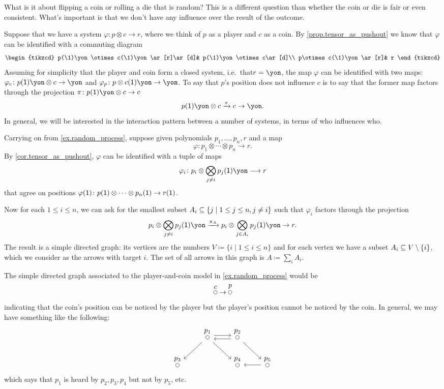 \documentclass[Book-Poly]{subfiles}
\begin{document}
\begin{example}\label{ex.random_process}
What is it about flipping a coin or rolling a die that is random? This is a different question than whether the coin or die is fair or even consistent. What's important is that we don't have any influence over the result of the outcome.

Suppose that we have a system $\varphi\colon p\otimes c\to r$, where we think of $p$ as a player and $c$ as a coin. By \cref{prop.tensor_as_pushout} we know that $\varphi$ can be identified with a commuting diagram
\[
\begin{tikzcd}
	p(\1)\yon\otimes c(\1)\yon\ar[r]\ar[d]&
	p(\1)\yon\otimes c\ar[d]\\
	p\otimes c(\1)\yon\ar[r]&
	r
\end{tikzcd}
\]
Assuming for simplicity that the player and coin form a closed system, i.e.\ that$r=\yon$, the map $\varphi$ can be identified with two maps: $\varphi_c\colon p(\1)\yon\otimes c\to\yon$ and $\varphi_p\colon p\otimes c(\1)\yon\to\yon$. To say that $p$'s position does not influence $c$ is to say that the former map factors through the projection $\pi\colon p(\1)\yon\otimes c\to c$
\[
	p(\1)\yon\otimes c\To{\pi} c\to \yon.
\]
In general, we will be interested in the interaction pattern between a number of systems, in terms of who influences who.
\end{example}

\begin{example}
Carrying on from \cref{ex.random_process}, suppose given polynomials $p_1,\ldots,p_n,r$ and a map
\[\varphi\colon p_1\otimes\cdots\otimes p_n\to r.\]
By \cref{cor.tensor_as_pushout}, $\varphi$ can be identified with a tuple of maps 
\[\varphi_i\colon p_i\otimes\bigotimes_{j\neq i}p_j(\1)\yon\too r\]
that agree on positions $\varphi(\1)\colon p(\1)\otimes\cdots\otimes p_n(\1)\to r(\1)$.

Now for each $1\leq i\leq n$, we can ask for the smallest subset $A_i\ss\{j\mid 1\leq j\leq n, j\neq i\}$ such that $\varphi_i$ factors through the projection
\[
	p_i\otimes\bigotimes_{j\neq i}p_j(\1)\yon\To{\pi_A}
	p_i\otimes\bigotimes_{j\in A_i}p_j(\1)\yon\to
	r.
\]
The result is a simple directed graph: its vertices are the numbers $V\coloneqq\{i\mid 1\leq i\leq n\}$ and for each vertex we have a subset $A_i\ss V\setminus \{i\}$, which we consider as the arrows with target $i$. The set of all arrows in this graph is $A\coloneqq\sum_{i}A_i$.

The simple directed graph associated to the player-and-coin model in \cref{ex.random_process} would be
\[
\LMO{c}\to\LMO{p}
\]
indicating that the coin's position can be noticed by the player but the player's position cannot be noticed by the coin. In general, we may have something like the following:
\[
\begin{tikzcd}
	&
	\LMO{p_1}\ar[dl]\ar[dr]\ar[r, shift left]&
	\LMO{p_2}\ar[l, shift left]\ar[dr]\\
	\LMO{p_3}&&
	\LMO{p_4}&
	\LMO{p_5}\ar[l]
\end{tikzcd}
\]
which says that $p_1$ is heard by $p_2,p_3,p_4$ but not by $p_5$, etc.
\end{example}
\end{document}
